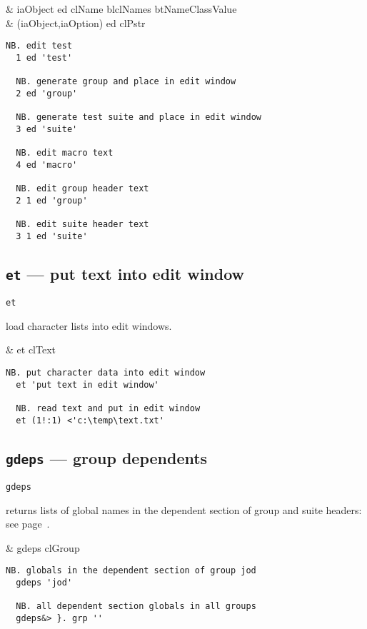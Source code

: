 \begin{wordhead}
\dyad & iaObject ed clName \argsep blclNames \argsep btNameClassValue \\
      & (iaObject,iaOption) ed clPstr \\
\end{wordhead}
\begin{lstlisting}[frame=single,framerule=0pt]      
  NB. edit test
  1 ed 'test'
  
  NB. generate group and place in edit window    
  2 ed 'group'  
   
  NB. generate test suite and place in edit window
  3 ed 'suite'  
  
  NB. edit macro text 
  4 ed 'macro'  
   
  NB. edit group header text
  2 1 ed 'group' 
  
  NB. edit suite header text
  3 1 ed 'suite'  
\end{lstlisting}

\subsection{\texttt{et} --- put text into edit window}\label{ss:et} 

\hypertarget{il:et}{\texttt{et}} load character lists into edit windows.

\begin{wordhead}
\monad & et clText \\
\end{wordhead}
\begin{lstlisting}[frame=single,framerule=0pt]
  NB. put character data into edit window
  et 'put text in edit window' 

  NB. read text and put in edit window
  et (1!:1) <'c:\temp\text.txt' 
\end{lstlisting}

\subsection{\texttt{gdeps} --- group dependents}\label{ss:gdeps}

\hypertarget{il:gdeps}{\texttt{gdeps}} returns lists of global names 
in the dependent section of group and suite headers: see page~\pageref{ss:depsec}.

\begin{wordhead}
\monad & gdeps clGroup \\
\end{wordhead}
\begin{lstlisting}[frame=single,framerule=0pt]
  NB. globals in the dependent section of group jod
  gdeps 'jod'  
  
  NB. all dependent section globals in all groups
  gdeps&> }. grp ''
\end{lstlisting}

